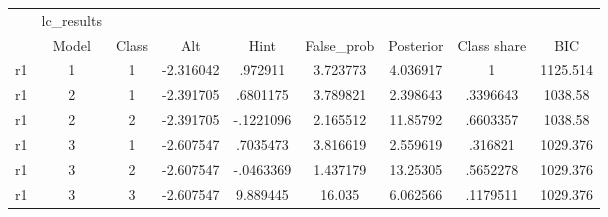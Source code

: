 \begin{tabular}{l*{8}{c}}
\hline\hline
            &  lc\_results&            &            &            &            &            &            &            \\
            &       Model&       Class&         Alt&        Hint&  False\_prob&   Posterior& Class share&         BIC\\
\hline
r1          &           1&           1&   -2.316042&     .972911&    3.723773&    4.036917&           1&    1125.514\\
r1          &           2&           1&   -2.391705&    .6801175&    3.789821&    2.398643&    .3396643&     1038.58\\
r1          &           2&           2&   -2.391705&   -.1221096&    2.165512&    11.85792&    .6603357&     1038.58\\
r1          &           3&           1&   -2.607547&    .7035473&    3.816619&    2.559619&     .316821&    1029.376\\
r1          &           3&           2&   -2.607547&   -.0463369&    1.437179&    13.25305&    .5652278&    1029.376\\
r1          &           3&           3&   -2.607547&    9.889445&      16.035&    6.062566&    .1179511&    1029.376\\
\hline\hline
\end{tabular}
